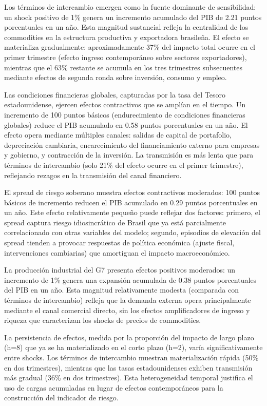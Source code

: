 \documentclass[3p,11pt,draft,natbib=false]{elsarticle}
\begin{document}
Los términos de intercambio emergen como la fuente dominante de sensibilidad: un shock positivo de 1\% genera un incremento acumulado del PIB de 2.21 puntos porcentuales en un año. Esta magnitud sustancial refleja la centralidad de los commodities en la estructura productiva y exportadora brasileña. El efecto se materializa gradualmente: aproximadamente 37\% del impacto total ocurre en el primer trimestre (efecto ingreso contemporáneo sobre sectores exportadores), mientras que el 63\% restante se acumula en los tres trimestres subsecuentes mediante efectos de segunda ronda sobre inversión, consumo y empleo.

Las condiciones financieras globales, capturadas por la tasa del Tesoro estadounidense, ejercen efectos contractivos que se amplían en el tiempo. Un incremento de 100 puntos básicos (endurecimiento de condiciones financieras globales) reduce el PIB acumulado en 0.58 puntos porcentuales en un año. El efecto opera mediante múltiples canales: salidas de capital de portafolio, depreciación cambiaria, encarecimiento del financiamiento externo para empresas y gobierno, y contracción de la inversión. La transmisión es más lenta que para términos de intercambio (solo 21\% del efecto ocurre en el primer trimestre), reflejando rezagos en la transmisión del canal financiero.

El spread de riesgo soberano muestra efectos contractivos moderados: 100 puntos básicos de incremento reducen el PIB acumulado en 0.29 puntos porcentuales en un año. Este efecto relativamente pequeño puede reflejar dos factores: primero, el spread captura riesgo idiosincrático de Brasil que ya está parcialmente correlacionado con otras variables del modelo; segundo, episodios de elevación del spread tienden a provocar respuestas de política económica (ajuste fiscal, intervenciones cambiarias) que amortiguan el impacto macroeconómico.

La producción industrial del G7 presenta efectos positivos moderados: un incremento de 1\% genera una expansión acumulada de 0.38 puntos porcentuales del PIB en un año. Esta magnitud relativamente modesta (comparada con términos de intercambio) refleja que la demanda externa opera principalmente mediante el canal comercial directo, sin los efectos amplificadores de ingreso y riqueza que caracterizan los shocks de precios de commodities.

La persistencia de efectos, medida por la proporción del impacto de largo plazo (h=8) que ya se ha materializado en el corto plazo (h=2), varía significativamente entre shocks. Los términos de intercambio muestran materialización rápida (50\% en dos trimestres), mientras que las tasas estadounidenses exhiben transmisión más gradual (36\% en dos trimestres). Esta heterogeneidad temporal justifica el uso de cargas acumuladas en lugar de efectos contemporáneos para la construcción del indicador de riesgo.
\end{document}
